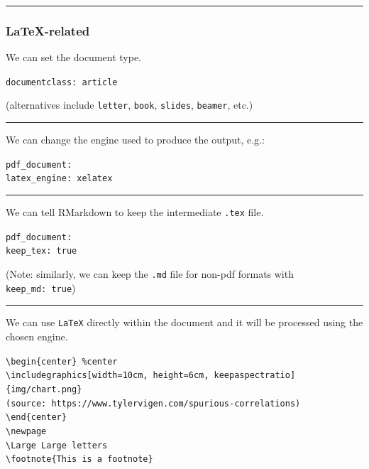 \documentclass[
  11pt,
]{article}
\begin{document}
\begin{center}\rule{0.5\linewidth}{0.5pt}\end{center}

\hypertarget{latex-related}{%
\subsubsection{LaTeX-related}\label{latex-related}}

We can set the document type.

\texttt{documentclass:\ article}

(alternatives include \texttt{letter}, \texttt{book}, \texttt{slides},
\texttt{beamer}, etc.)

\begin{center}\rule{0.5\linewidth}{0.5pt}\end{center}

We can change the engine used to produce the output, e.g.:

\texttt{pdf\_document:}\\
\texttt{latex\_engine:\ xelatex}

\begin{center}\rule{0.5\linewidth}{0.5pt}\end{center}

We can tell RMarkdown to keep the intermediate \texttt{.tex} file.

\texttt{pdf\_document:}\\
\texttt{keep\_tex:\ true}

(Note: similarly, we can keep the \texttt{.md} file for non-pdf formats
with \texttt{keep\_md:\ true})

\begin{center}\rule{0.5\linewidth}{0.5pt}\end{center}

We can use \texttt{LaTeX} directly within the document and it will be
processed using the chosen engine.

\texttt{\textbackslash{}begin\{center\}\ \%center}\\
\texttt{\textbackslash{}includegraphics{[}width=10cm,\ height=6cm,\ keepaspectratio{]}\{img/chart.png\}}~\\
\texttt{(source:\ https://www.tylervigen.com/spurious-correlations)}~\\
\texttt{\textbackslash{}end\{center\}}~\\
\texttt{\textbackslash{}newpage}~\\
\texttt{\textbackslash{}Large\ Large\ letters}~\\
\texttt{\textbackslash{}footnote\{This\ is\ a\ footnote\}}
\end{document}
